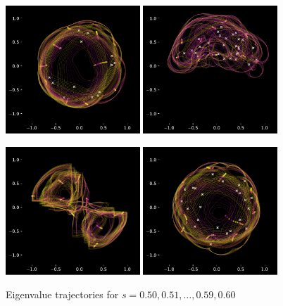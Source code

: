 \documentclass{article}
\begin{document}
	\newpage

	\begin{figure}[htbp]
		\centering
		\includegraphics[width=0.45\textwidth]{figures/N10Circle05to06.pdf}
		\includegraphics[width=0.45\textwidth]{figures/N10Meander05to06.pdf}

		\includegraphics[width=0.45\textwidth]{figures/N10Crossing05to06.pdf}
		\includegraphics[width=0.45\textwidth]{figures/N10Circle05to06B.pdf}
		\caption{Eigenvalue trajectories for $s= 0.50, 0.51, \dots , 0.59, 0.60$ }
		\label{fig:pdf_image}
	\end{figure}
\end{document}
